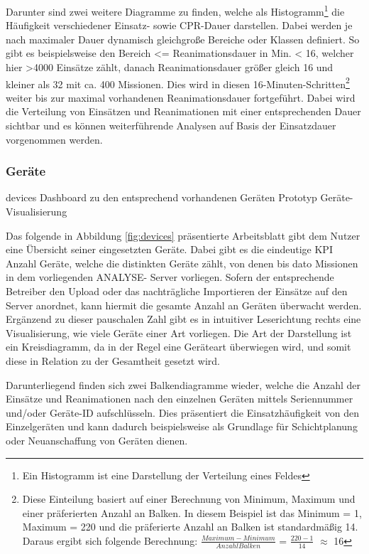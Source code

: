 Darunter sind zwei weitere Diagramme zu finden, welche als Histogramm\footnote{Ein Histogramm ist eine Darstellung der Verteilung eines Feldes} die Häufigkeit verschiedener Einsatz- sowie \gls{CPR}-Dauer darstellen.
Dabei werden je nach maximaler Dauer dynamisch gleichgroße Bereiche oder \glqq Klassen\grqq{} definiert.
So gibt es beispielsweise den Bereich  <= Reanimationsdauer in Min. < 16\grqq{}, welcher hier >4000 Einsätze zählt, danach Reanimationsdauer größer gleich 16 und kleiner als 32 mit ca. 400 Missionen.
Dies wird in diesen 16-Minuten-Schritten\footnote{Diese Einteilung basiert auf einer Berechnung von Minimum, Maximum und einer präferierten Anzahl an Balken.
In diesem Beispiel ist das Minimum = 1, Maximum = 220 und die präferierte Anzahl an Balken ist standardmäßig 14.
Daraus ergibt sich folgende Berechnung: $\frac{Maximum-Minimum}{Anzahl Balken}$ = $\frac{220-1}{14}$ $\approx$ 16}
 weiter bis zur maximal vorhandenen Reanimationsdauer fortgeführt.
Dabei wird die Verteilung von Einsätzen und Reanimationen mit einer entsprechenden Dauer sichtbar und es können weiterführende Analysen auf Basis der Einsatzdauer vorgenommen werden.

\subsubsection{Geräte}
\label{subsub:geräte}
\bildbreit
{devices}
{Dashboard zu den entsprechend vorhandenen Geräten}
{Prototyp Geräte-Visualisierung}

Das folgende in Abbildung \ref{fig:devices} präsentierte Arbeitsblatt gibt dem Nutzer eine Übersicht seiner eingesetzten Geräte.
Dabei gibt es die eindeutige \gls{KPI} \glqq Anzahl Geräte\grqq{}, welche die distinkten Geräte zählt, von denen bis dato Missionen in dem vorliegenden \gls{ANALYSE}- Server vorliegen.
Sofern der entsprechende Betreiber den Upload oder das nachträgliche Importieren der Einsätze auf den Server anordnet, kann hiermit die gesamte Anzahl an Geräten überwacht werden. %
Ergänzend zu dieser pauschalen Zahl gibt es in intuitiver Leserichtung rechts eine Visualisierung, wie viele Geräte einer Art vorliegen.
Die Art der Darstellung ist ein Kreisdiagramm, da in der Regel eine Geräteart überwiegen wird, und somit diese in Relation zu der Gesamtheit gesetzt wird.

Darunterliegend finden sich zwei Balkendiagramme wieder, welche die Anzahl der Einsätze und Reanimationen nach den einzelnen Geräten mittels Seriennummer und/oder Geräte-ID aufschlüsseln.
Dies präsentiert die Einsatzhäufigkeit von den Einzelgeräten und kann dadurch beispielsweise als Grundlage für Schichtplanung oder Neuanschaffung von Geräten dienen.

